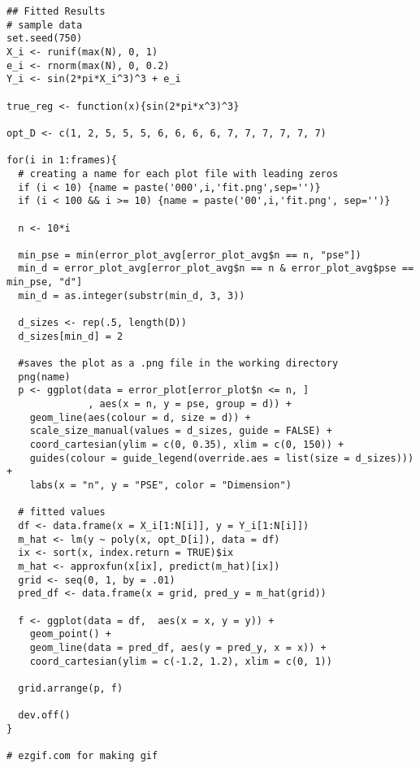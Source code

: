 \begin{verbatim}
## Fitted Results
# sample data
set.seed(750)
X_i <- runif(max(N), 0, 1)
e_i <- rnorm(max(N), 0, 0.2)
Y_i <- sin(2*pi*X_i^3)^3 + e_i

true_reg <- function(x){sin(2*pi*x^3)^3}

opt_D <- c(1, 2, 5, 5, 5, 6, 6, 6, 6, 7, 7, 7, 7, 7, 7)

for(i in 1:frames){
  # creating a name for each plot file with leading zeros
  if (i < 10) {name = paste('000',i,'fit.png',sep='')}
  if (i < 100 && i >= 10) {name = paste('00',i,'fit.png', sep='')}
  
  n <- 10*i
  
  min_pse = min(error_plot_avg[error_plot_avg$n == n, "pse"])
  min_d = error_plot_avg[error_plot_avg$n == n & error_plot_avg$pse == min_pse, "d"]
  min_d = as.integer(substr(min_d, 3, 3))
  
  d_sizes <- rep(.5, length(D))
  d_sizes[min_d] = 2
  
  #saves the plot as a .png file in the working directory
  png(name)
  p <- ggplot(data = error_plot[error_plot$n <= n, ]
              , aes(x = n, y = pse, group = d)) + 
    geom_line(aes(colour = d, size = d)) +
    scale_size_manual(values = d_sizes, guide = FALSE) +
    coord_cartesian(ylim = c(0, 0.35), xlim = c(0, 150)) +
    guides(colour = guide_legend(override.aes = list(size = d_sizes))) + 
    labs(x = "n", y = "PSE", color = "Dimension")
  
  # fitted values
  df <- data.frame(x = X_i[1:N[i]], y = Y_i[1:N[i]])
  m_hat <- lm(y ~ poly(x, opt_D[i]), data = df)
  ix <- sort(x, index.return = TRUE)$ix
  m_hat <- approxfun(x[ix], predict(m_hat)[ix])
  grid <- seq(0, 1, by = .01)
  pred_df <- data.frame(x = grid, pred_y = m_hat(grid))
  
  f <- ggplot(data = df,  aes(x = x, y = y)) + 
    geom_point() +
    geom_line(data = pred_df, aes(y = pred_y, x = x)) +
    coord_cartesian(ylim = c(-1.2, 1.2), xlim = c(0, 1))

  grid.arrange(p, f)
  
  dev.off()
}

# ezgif.com for making gif

\end{verbatim}
